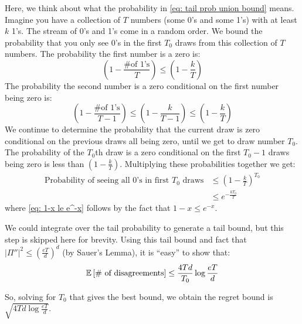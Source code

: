 \documentclass[11pt]{article}
\begin{document}
Here, we think about what the probability in \eqref{eq: tail prob union bound} means. Imagine you have a collection of $T$ numbers (some 0's and some 1's) with at least $k$ 1's. The stream of 0's and 1's come in a random order. We bound the probability that you only see 0's in the first $T_0$ draws from this collection of $T$ numbers. The probability the first number is a zero is:
\begin{equation}
(1-\frac{\text{\# of 1's}}{T}) \le (1- \frac{k}{T})
\end{equation}
The probability the second number is a zero conditional on the first number being zero is:
\begin{equation}
(1-\frac{\text{\# of 1's}}{T-1}) \le (1-\frac{k}{T-1}) \le (1 - \frac{k}{T})
\end{equation}
We continue to determine the probability that the current draw is zero conditional on the previous draws all being zero, until we get to draw number $T_0$. The probability of the $T_0${th} draw is a zero conditional on the first $T_0-1$ draws being zero is less than $(1-\frac{k}{T})$. Multiplying these probabilities together we get:
\begin{align}
\text{Probability of seeing all 0's in first } T_0 \text{ draws} &\le (1-\frac{k}{T})^{T_0}\\
&\le e^{-\frac{kT_0}{T}} \label{eq: 1-x le e^-x}
\end{align}
where \eqref{eq: 1-x le e^-x} follows by the fact that $1-x \le e^{-x}$.

We could integrate over the tail probability to generate a tail bound, but this step is skipped here for brevity. Using this tail bound and fact that $|\Pi''|^2 \le (\frac{eT}{d})^d$ (by Sauer's Lemma), it is ``easy'' to show that:
\begin{equation}\label{eq: bound number of disagreements}
\mathbb{E}\left[ \text{\# of disagreements} \right] \le \frac{4Td}{T_0}\log{\frac{eT}{d}}
\end{equation}

So, solving for $T_0$ that gives the best bound, we obtain the regret bound is $\sqrt{4Td\log{\frac{eT}{d}}}$.




\end{document}
